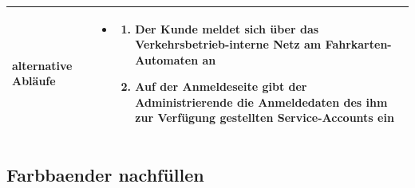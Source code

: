 \documentclass{article}
\begin{document}
\begin{tabularx}{\textwidth}{|l|X|}
        \textbf{alternative Abläufe} & \begin{itemize}
            \item \begin{enumerate}
                \item Der \gls{Kunde} meldet sich über das Verkehrsbetrieb-interne \gls{Netz} am Fahrkarten-Automaten an
                \item Auf der Anmeldeseite gibt der Administrierende die Anmeldedaten des ihm zur Verfügung gestellten \gls{Service-Accounts} ein
            \end{enumerate}
        \end{itemize} \\\hline
    \end{tabularx}

    \subsection{\gls{Farbbaender} nachfüllen}
\end{document}
